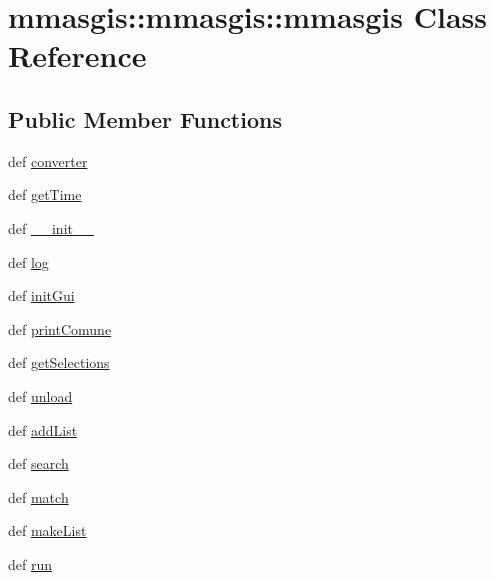 \hypertarget{classmmasgis_1_1mmasgis_1_1mmasgis}{
\section{mmasgis::mmasgis::mmasgis Class Reference}
\label{classmmasgis_1_1mmasgis_1_1mmasgis}
}
\subsection*{Public Member Functions}
\begin{DoxyCompactItemize}
\item 
def \hyperlink{classmmasgis_1_1mmasgis_1_1mmasgis_aa08797e9cfd530cb8711696aead9afad}{converter}
\item 
def \hyperlink{classmmasgis_1_1mmasgis_1_1mmasgis_a30ed2e6150ded187a110fda7288289e5}{getTime}
\item 
def \hyperlink{classmmasgis_1_1mmasgis_1_1mmasgis_a062f4323a5fc5c75bcbd4d3984e7dc26}{\_\-\_\-init\_\-\_\-}
\item 
def \hyperlink{classmmasgis_1_1mmasgis_1_1mmasgis_a5c1f7c9d4466b1c731e3ed2ee077c8b4}{log}
\item 
def \hyperlink{classmmasgis_1_1mmasgis_1_1mmasgis_a1c37d24fb8c360b45a991f8b7e953098}{initGui}
\item 
def \hyperlink{classmmasgis_1_1mmasgis_1_1mmasgis_a2d25ad544405d5621c54609961a2396b}{printComune}
\item 
def \hyperlink{classmmasgis_1_1mmasgis_1_1mmasgis_aa5253d2581f7eef719b3bf3db69ae210}{getSelections}
\item 
def \hyperlink{classmmasgis_1_1mmasgis_1_1mmasgis_a9f05faf813e3a6d9f34ce36a898621e8}{unload}
\item 
def \hyperlink{classmmasgis_1_1mmasgis_1_1mmasgis_a54db43b2474eeffa0c4110d2c805ec6f}{addList}
\item 
def \hyperlink{classmmasgis_1_1mmasgis_1_1mmasgis_a372e9bd8f3d6edc5cb46d210e0f38839}{search}
\item 
def \hyperlink{classmmasgis_1_1mmasgis_1_1mmasgis_a0ed0ba49155c1a1ad853221a1e7d2566}{match}
\item 
def \hyperlink{classmmasgis_1_1mmasgis_1_1mmasgis_a9d1f4dd65136e9c595cbda3111d2de1e}{makeList}
\item 
def \hyperlink{classmmasgis_1_1mmasgis_1_1mmasgis_afcea7363223344ab41fb83dc89fa2d74}{run}
\end{DoxyCompactItemize}
